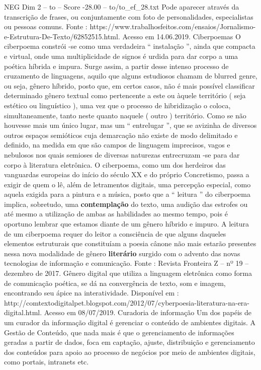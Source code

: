 \begin{textsample}{NEG Dim 2 – to – Score -28.00 – to/to\_ef\_28.txt}
Pode aparecer através da transcrição de frases, ou conjuntamente com foto de personalidades, especialistas ou pessoas comuns.
Fonte : https://www.trabalhosfeitos.com/ensaios/Jornalismo-e-Estrutura-De-Texto/62852515.html.
Acesso em 14.06.2019.
Ciberpoemas O ciberpoema constrói -se como uma verdadeira “ instalação ”, ainda que compacta e virtual, onde uma multiplicidade de signos é urdida para dar corpo a uma poética híbrida e impura.
Surge assim, a partir desse intenso processo de cruzamento de linguagens, aquilo que alguns estudiosos chamam de blurred genre, ou seja, gênero híbrido, posto que, em certos casos, não é mais possível classificar determinado gênero textual como pertencente a este ou àquele território ( seja estético ou linguístico ), uma vez que o processo de hibridização o coloca, simultaneamente, tanto neste quanto naquele ( outro ) território.
Como se não houvesse mais um único lugar, mas um “ entrelugar ”, que se avizinha de diversos outros espaços semióticos cuja demarcação não existe de modo delimitado e definido, na medida em que são campos de linguagem imprecisos, vagos e nebulosos nos quais semioses de diversas naturezas entrecruzam -se para dar corpo à literatura eletrônica.
O ciberpoema, como um dos herdeiros das vanguardas europeias do início do século XX e do próprio Concretismo, passa a exigir de quem o lê, além de letramentos digitais, uma percepção especial, como aquela exigida para a pintura e a música, posto que a “ leitura ” do ciberpoema implica, sobretudo, uma \textbf{contemplação} do texto, uma audição das estrofes ou até mesmo a utilização de ambas as habilidades ao mesmo tempo, pois é oportuno lembrar que estamos diante de um gênero híbrido e impuro.
A leitura de um ciberpoema requer do leitor a consciência de que alguns daqueles elementos estruturais que constituíam a poesia cânone não mais estarão presentes nessa nova modalidade de gênero \textbf{literário} surgido com o advento das novas tecnologias de informação e comunicação.
Fonte : Revista Fronteira Z – nº 19 – dezembro de 2017.
Gênero digital que utiliza a linguagem eletrônica como forma de comunicação poética, se dá na convergência de texto, som e imagem, encontrando seu ápice na interatividade.
Disponível em : http://comtextodigitalpet.blogspot.com/2012/07/cyberpoesia-literatura-na-era-digital.html.
Acesso em 08/07/2019.
Curadoria de informação Um dos papéis de um curador da informação digital é gerenciar o conteúdo de ambientes digitais.
A Gestão de Conteúdo, que nada mais é que o gerenciamento de informações geradas a partir de dados, foca em captação, ajuste, distribuição e gerenciamento dos conteúdos para apoio ao processo de negócios por meio de ambientes digitais, como portais, intranets etc.

\end{textsample}
